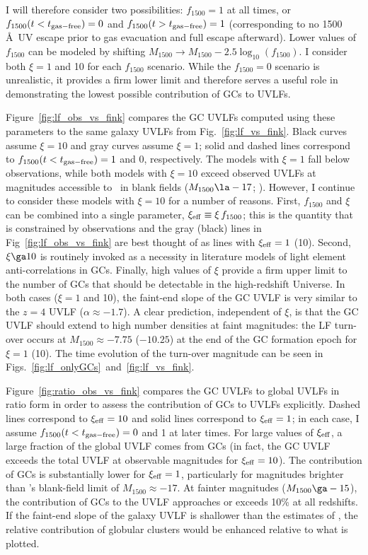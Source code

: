 \documentclass[fleqn,usenatbib]{mnras}
\newcommand{\xieff}{\xi_{\rm eff}}
\newcommand{\fescobs}{f_{1500}}
\newcommand{\tgasfree}{t_{\rm gas-free}}
\begin{document}
{I will therefore consider two possibilities: $\fescobs=1$ at all times, or
$\fescobs (t<\tgasfree)=0$ and $\fescobs (t>\tgasfree)=1$ (corresponding to no
1500 \AA\ UV escape prior to gas evacuation and full escape afterward). Lower
values of $\fescobs$ can be modeled by shifting
$M_{1500} \rightarrow M_{1500}-2.5\log_{10}(\fescobs)$. I consider both $\xi=1$
and 10 for each $\fescobs$ scenario. While the $\fescobs=0$ scenario is
unrealistic, it provides a firm lower limit and therefore serves a useful role
in demonstrating the lowest possible contribution of GCs to UVLFs.


Figure~\ref{fig:lf_obs_vs_fink} compares the GC UVLFs computed using these
parameters to the same galaxy UVLFs from Fig.~\ref{fig:lf_vs_fink}. Black curves
assume $\xi=10$ and gray curves assume $\xi=1$; solid and dashed lines
correspond to $\fescobs (t<\tgasfree)=1$ and 0, respectively. The models with
$\xi=1$ fall below observations, while both models with $\xi=10$ exceed observed
UVLFs at magnitudes accessible to \hst\ in blank fields ($M_{1500} \la -17$;
\citealt{mclure2013, schenker2013}). However, I continue to consider these models with
$\xi=10$ for a number of reasons. First, $\fescobs$ and $\xi$ can
be combined into a single parameter, $\xieff \equiv \xi \, \fescobs$; this is
the quantity that is constrained by observations and the gray (black) lines in
Fig~\ref{fig:lf_obs_vs_fink} are best thought of as lines with $\xieff =1$
(10). Second, $\xi \ga 10$ is routinely invoked as a necessity in literature
models of light element anti-correlations in GCs. Finally, high values of $\xi$
provide a firm upper limit to the number of GCs that should be detectable in the
high-redshift Universe. In both cases ($\xi=1$ and 10), the faint-end slope of
the GC UVLF is very similar to the $z=4$ UVLF ($\alpha \approx -1.7$). A clear
prediction, independent of $\xi$, is that the GC UVLF should extend to high
number densities at faint magnitudes: the LF turn-over occurs at
$M_{1500} \approx -7.75$ ($-10.25$) at the end of the GC formation epoch for
$\xi=1$ (10). The time evolution of the turn-over magnitude can be seen in
Figs.~\ref{fig:lf_onlyGCs}~and~\ref{fig:lf_vs_fink}.


Figure~\ref{fig:ratio_obs_vs_fink} compares the GC UVLFs to global UVLFs in
ratio form in order to assess the contribution of GCs to UVLFs
explicitly. Dashed lines correspond to $\xieff=10$ and solid lines correspond to
$\xieff=1$; in each case, I assume $\fescobs (t<\tgasfree)=0$ and 1 at later
times. For large values of $\xieff$, a large fraction of the global UVLF comes
from GCs (in fact, the GC UVLF exceeds the total UVLF at observable magnitudes
for $\xieff=10$). The contribution of GCs is substantially lower for $\xieff=1$,
particularly for magnitudes brighter than \hst's blank-field limit of
$M_{1500} \approx -17$. At fainter magnitudes ($M_{1500} \ga -15$), the
contribution of GCs to the UVLF approaches or exceeds 10\% at all redshifts. If
the faint-end slope of the galaxy UVLF is shallower than the estimates of
\citet{finkelstein2016}, the relative contribution of globular clusters would be
enhanced relative to what is plotted.

}
\end{document}
